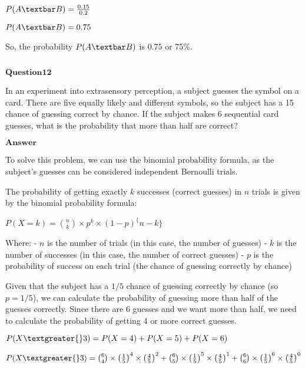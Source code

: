 \documentclass[11pt]{article}
\makeatletter
\newcommand{\boxspacing}{\kern\kvtcb@left@rule\kern\kvtcb@boxsep}
\newcommand{\prompt}[4]{
        {\ttfamily\llap{{\color{#2}[#3]:\hspace{3pt}#4}}\vspace{-\baselineskip}}
    }
\makeatother
\begin{document}
$ P(A\textbar B) = \frac{0.15}{0.2} $

$ P(A\textbar B) = 0.75 $

So, the probability $ P(A\textbar B) $ is $ 0.75 $ or 75\%.

    \begin{tcolorbox}[breakable, size=fbox, boxrule=1pt, pad at break*=1mm,colback=cellbackground, colframe=cellborder]
\prompt{In}{incolor}{ }{\boxspacing}
\begin{Verbatim}[commandchars=\\\{\}]

\end{Verbatim}
\end{tcolorbox}

    $\textbf{Question12}$

In an experiment into extrasensory perception, a subject guesses the
symbol on a card. There are five equally likely and different symbols,
so the subject has a 15 chance of guessing correct by chance. If the
subject makes 6 sequential card guesses, what is the probability that
more than half are correct?

$\textbf{Answer}$

    To solve this problem, we can use the binomial probability formula, as
the subject's guesses can be considered independent Bernoulli trials.

The probability of getting exactly $ k $ successes (correct guesses)
in $ n $ trials is given by the binomial probability formula:

$ P(X = k) = \binom{n}{k} \times p^k \times (1 - p)^\{n - k\} $

Where: - $ n $ is the number of trials (in this case, the number of
guesses) - $ k $ is the number of successes (in this case, the number
of correct guesses) - $ p $ is the probability of success on each
trial (the chance of guessing correctly by chance)

Given that the subject has a $ 1/5 $ chance of guessing correctly by
chance (so $ p = 1/5 $), we can calculate the probability of guessing
more than half of the guesses correctly. Since there are 6 guesses and
we want more than half, we need to calculate the probability of getting
4 or more correct guesses.

$ P(X \textgreater{} 3) = P(X = 4) + P(X = 5) + P(X = 6) $

$ P(X \textgreater{} 3) = \binom{6}{4}
\times \left(\frac{1}{5}\right)^4
\times \left(\frac{4}{5}\right)^2 + \binom{6}{5}
\times \left(\frac{1}{5}\right)^5
\times \left(\frac{4}{5}\right)^1 + \binom{6}{6}
\times \left(\frac{1}{5}\right)^6
\times \left(\frac{4}{5}\right)^0 $
\end{document}

